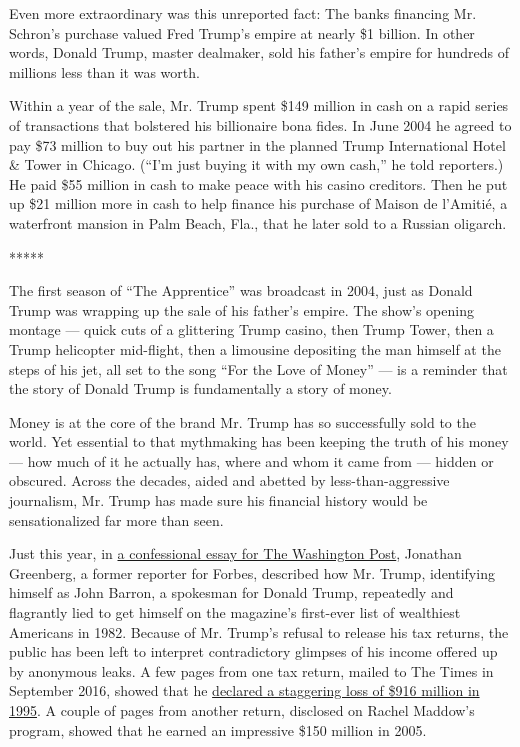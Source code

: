 Even more extraordinary was this unreported fact: The banks financing
Mr. Schron's purchase valued Fred Trump's empire at nearly \$1 billion.
In other words, Donald Trump, master dealmaker, sold his father's empire
for hundreds of millions less than it was worth.

Within a year of the sale, Mr. Trump spent \$149 million in cash on a
rapid series of transactions that bolstered his billionaire bona fides.
In June 2004 he agreed to pay \$73 million to buy out his partner in the
planned Trump International Hotel \& Tower in Chicago. (``I'm just
buying it with my own cash,'' he told reporters.) He paid \$55 million
in cash to make peace with his casino creditors. Then he put up \$21
million more in cash to help finance his purchase of Maison de l'Amitié,
a waterfront mansion in Palm Beach, Fla., that he later sold to a
Russian oligarch.

*****

The first season of ``The Apprentice'' was broadcast in 2004, just as
Donald Trump was wrapping up the sale of his father's empire. The show's
opening montage --- quick cuts of a glittering Trump casino, then Trump
Tower, then a Trump helicopter mid-flight, then a limousine depositing
the man himself at the steps of his jet, all set to the song ``For the
Love of Money'' --- is a reminder that the story of Donald Trump is
fundamentally a story of money.

Money is at the core of the brand Mr. Trump has so successfully sold to
the world. Yet essential to that mythmaking has been keeping the truth
of his money --- how much of it he actually has, where and whom it came
from --- hidden or obscured. Across the decades, aided and abetted by
less-than-aggressive journalism, Mr. Trump has made sure his financial
history would be sensationalized far more than seen.

Just this year, in
\href{https://www.washingtonpost.com/outlook/trump-lied-to-me-about-his-wealth-to-get-onto-the-forbes-400-here-are-the-tapes/2018/04/20/ac762b08-4287-11e8-8569-26fda6b404c7_story.html?utm_term=.58b3e74458b5}{a
confessional essay for The Washington Post}, Jonathan Greenberg, a
former reporter for Forbes, described how Mr. Trump, identifying himself
as John Barron, a spokesman for Donald Trump, repeatedly and flagrantly
lied to get himself on the magazine's first-ever list of wealthiest
Americans in 1982. Because of Mr. Trump's refusal to release his tax
returns, the public has been left to interpret contradictory glimpses of
his income offered up by anonymous leaks. A few pages from one tax
return, mailed to The Times in September 2016, showed that he
\href{https://www.nytimes.com/2016/10/02/us/politics/donald-trump-taxes.html}{declared
a staggering loss of \$916 million in 1995}. A couple of pages from
another return, disclosed on Rachel Maddow's program, showed that he
earned an impressive \$150 million in 2005.

